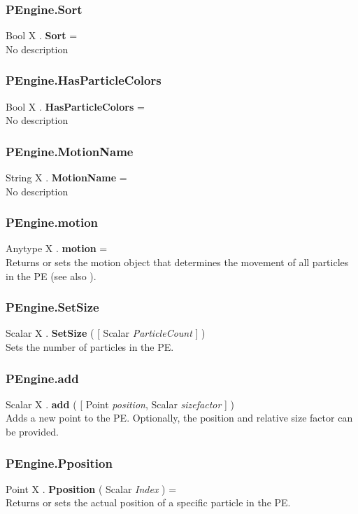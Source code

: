 \subsubsection{PEngine.Sort \label{F:PEngine:Sort}}
Bool X . \textbf{Sort} = \\
No description

\subsubsection{PEngine.HasParticleColors \label{F:PEngine:HasParticleColors}}
Bool X . \textbf{HasParticleColors} = \\
No description

\subsubsection{PEngine.MotionName \label{F:PEngine:MotionName}}
String X . \textbf{MotionName} = \\
No description

\subsubsection{PEngine.motion \label{F:PEngine:motion}}
Anytype X . \textbf{motion} = \\
Returns or sets the motion object that determines the movement of all particles in the PE
(see also ).

\subsubsection{PEngine.SetSize \label{F:PEngine:SetSize}}
Scalar X . \textbf{SetSize} (  [ Scalar \textit{ParticleCount} ] ) \\
Sets the number of particles in the PE.

\subsubsection{PEngine.add \label{F:PEngine:add}}
Scalar X . \textbf{add} (  [ Point \textit{position}, Scalar \textit{sizefactor} ] ) \\
Adds a new point to the PE. Optionally, the position and relative size factor can be provided.

\subsubsection{PEngine.Pposition \label{F:PEngine:Pposition}}
Point X . \textbf{Pposition} ( Scalar \textit{Index} ) = \\
Returns or sets the actual position of a specific particle in the PE.

